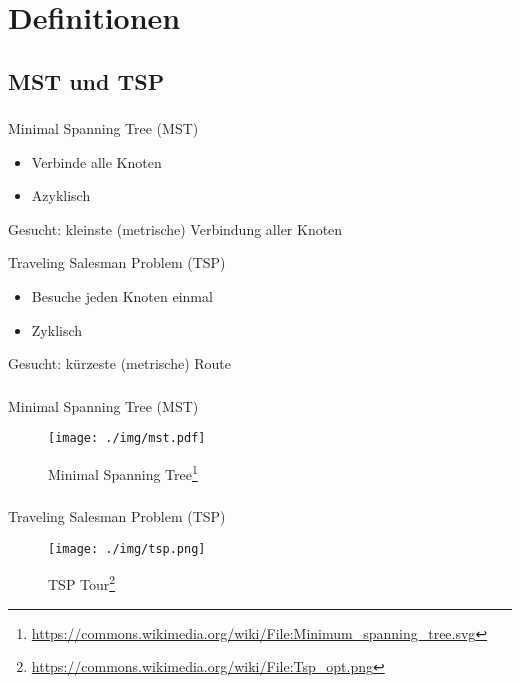 \section{Definitionen}
\subsection{MST und TSP}

\begin{frame}
    \frametitle{\insertsubsection}
    \begin{block}{Minimal Spanning Tree (MST)}
        \vspace{1em}
        \begin{itemize}
            \itemsep\setlength{.8em}
            \item Verbinde alle Knoten
            \item Azyklisch
        \end{itemize}
        Gesucht: kleinste (metrische) Verbindung aller Knoten
    \end{block}
    \vspace{1em}
    \begin{block}{Traveling Salesman Problem (TSP)}
        \vspace{1em}
        \begin{itemize}
            \itemsep\setlength{.8em}
            \item Besuche jeden Knoten einmal
            \item Zyklisch
        \end{itemize}
        Gesucht: kürzeste (metrische) Route
    \end{block}
\end{frame}

\begin{frame}
    \frametitle{\insertsubsection}
    Minimal Spanning Tree (MST)
    \begin{figure}
        \centering
        \texttt{[image: ./img/mst.pdf]}
        \caption{Minimal Spanning Tree\footnote{\url{https://commons.wikimedia.org/wiki/File:Minimum_spanning_tree.svg}}}
    \end{figure}
\end{frame}



\begin{frame}
    \frametitle{\insertsubsection}
    Traveling Salesman Problem (TSP)
    \begin{figure}
        \centering
        \texttt{[image: ./img/tsp.png]}
        \caption{TSP Tour\footnote{\url{https://commons.wikimedia.org/wiki/File:Tsp_opt.png}}}
    \end{figure}
\end{frame}
